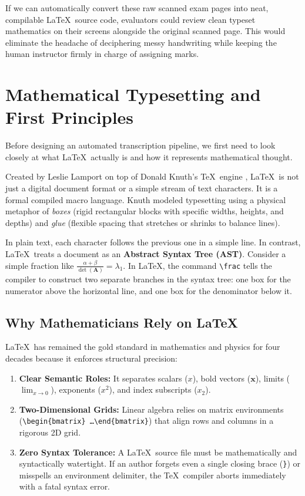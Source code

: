 If we can automatically convert these raw scanned exam pages into neat, compilable \LaTeX\ source code, evaluators could review clean typeset mathematics on their screens alongside the original scanned page. This would eliminate the headache of deciphering messy handwriting while keeping the human instructor firmly in charge of assigning marks.

\section{Mathematical Typesetting and First Principles}
\label{sec:first_principles_latex}

Before designing an automated transcription pipeline, we first need to look closely at what \LaTeX\ actually is and how it represents mathematical thought.

Created by Leslie Lamport on top of Donald Knuth's \TeX\ engine \cite{knuth1984texbook}, \LaTeX\ is not just a digital document format or a simple stream of text characters. It is a formal compiled macro language. Knuth modeled typesetting using a physical metaphor of \emph{boxes} (rigid rectangular blocks with specific widths, heights, and depths) and \emph{glue} (flexible spacing that stretches or shrinks to balance lines).

In plain text, each character follows the previous one in a simple line. In contrast, \LaTeX\ treats a document as an \textbf{Abstract Syntax Tree (AST)}. Consider a simple fraction like $\frac{\alpha + \beta}{\det(\mathbf{A})} = \lambda_1$. In \LaTeX, the command \texttt{\textbackslash frac} tells the compiler to construct two separate branches in the syntax tree: one box for the numerator above the horizontal line, and one box for the denominator below it. 

\subsection{Why Mathematicians Rely on \LaTeX}
\LaTeX\ has remained the gold standard in mathematics and physics for four decades because it enforces structural precision:
\begin{enumerate}
    \item \textbf{Clear Semantic Roles:} It separates scalars ($x$), bold vectors ($\mathbf{x}$), limits ($\lim_{x \to 0}$), exponents ($x^2$), and index subscripts ($x_2$).
    \item \textbf{Two-Dimensional Grids:} Linear algebra relies on matrix environments (\texttt{\textbackslash begin\{bmatrix\} \dots \textbackslash end\{bmatrix\}}) that align rows and columns in a rigorous 2D grid.
    \item \textbf{Zero Syntax Tolerance:} A \LaTeX\ source file must be mathematically and syntactically watertight. If an author forgets even a single closing brace (\texttt{\}}) or misspells an environment delimiter, the \TeX\ compiler aborts immediately with a fatal syntax error.
\end{enumerate}

